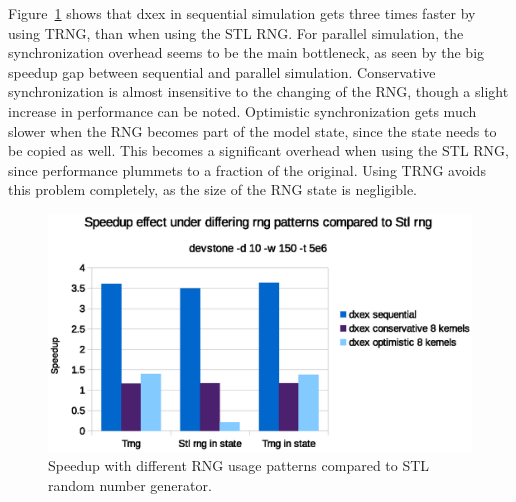 Figure~\ref{fig:Queuerngspeedup} shows that dxex in sequential simulation gets three times faster by using TRNG, than when using the STL RNG.
For parallel simulation, the synchronization overhead seems to be the main bottleneck, as seen by the big speedup gap between sequential and parallel simulation.
Conservative synchronization is almost insensitive to the changing of the RNG, though a slight increase in performance can be noted.
Optimistic synchronization gets much slower when the RNG becomes part of the model state, since the state needs to be copied as well.
This becomes a significant overhead when using the STL RNG, since performance plummets to a fraction of the original.
Using TRNG avoids this problem completely, as the size of the RNG state is negligible.

\begin{figure}
    \center
    \includegraphics[width=\columnwidth]{fig/rngspeedupeffectdevstone.eps}
    \caption{Speedup with different RNG usage patterns compared to STL random number generator.}
    \label{fig:Queuerngspeedup}
\end{figure}
